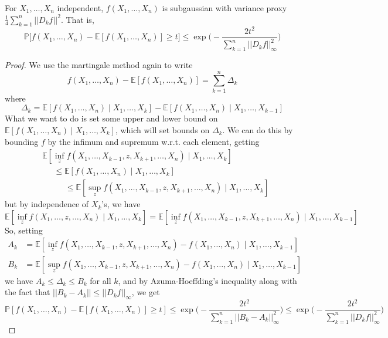 \documentclass{article}
\begin{document}
  \begin{theorem}[McDiarmid]
  For $X_1, \ldots, X_n$ independent, $f(X_1, \ldots, X_n)$ is subgaussian with variance proxy $\frac{1}{4} \sum_{k=1}^n ||D_k f||^2$. That is, 
  \[\mathbb{P}\big[ f(X_1, \ldots, X_n) - \mathbb{E}[f(X_1, \ldots, X_n)] \geq t \big] \leq \exp \bigg( -\frac{2 t^2}{\sum_{k=1}^n ||D_k f||^2_\infty} \bigg)\]
  \end{theorem}
  \begin{proof}
  We use the martingale method again to write 
  \[f(X_1, \ldots, X_n) - \mathbb{E}[f(X_1, \ldots, X_n)] = \sum_{k=1}^n \Delta_k\]
  where 
  \[\Delta_k = \mathbb{E}[f(X_1, \ldots, X_n) \mid X_1, \ldots, X_k] - \mathbb{E}[f(X_1, \ldots, X_n) \mid X_1, \ldots, X_{k-1}]\]
  What we want to do is set some upper and lower bound on $\mathbb{E}[f(X_1, \ldots, X_n) \mid X_1, \ldots, X_k]$, which will set bounds on $\Delta_k$. We can do this by bounding $f$ by the infimum and supremum w.r.t. each element, getting 
  \begin{align*}
      &\mathbb{E}[ \inf_z f(X_1, \ldots, X_{k-1}, z, X_{k+1}, \ldots, X_n) \mid X_1, \ldots, X_k] \\
      &\;\;\;\;\;\leq \mathbb{E}[f (X_1, \ldots, X_n) \mid X_1, \ldots, X_k] \\
      &\;\;\;\;\;\;\;\;\;\; \leq \mathbb{E}[ \sup_z f(X_1, \ldots, X_{k-1}, z, X_{k+1}, \ldots, X_n) \mid X_1, \ldots, X_k]
  \end{align*}
  but by independence of $X_k$'s, we have 
  \[\mathbb{E}[ \inf_z f(X_1, \ldots, z, \ldots, X_n) \mid X_1, \ldots, X_k] = \mathbb{E}[ \inf_z f(X_1, \ldots, X_{k-1}, z, X_{k+1}, \ldots, X_n) \mid X_1, \ldots, X_{k-1}]\]
  So, setting 
  \begin{align*}
      A_k & = \mathbb{E}[ \inf_z f(X_1, \ldots, X_{k-1}, z, X_{k+1}, \ldots, X_n) - f(X_1, \ldots, X_n) \mid X_1, \ldots, X_{k-1}] \\
      B_k & = \mathbb{E}[ \sup_z f(X_1, \ldots, X_{k-1}, z, X_{k+1}, \ldots, X_n) - f(X_1, \ldots, X_n) \mid X_1, \ldots, X_{k-1}]
  \end{align*}
  we have $A_k \leq \Delta_k \leq B_k$ for all $k$, and by Azuma-Hoeffding's inequality along with the fact that $||B_k - A_k|| \leq ||D_k f||_\infty$, we get 
  \[\mathbb{P}[ f(X_1, \ldots, X_n) - \mathbb{E}[ f(X_1, \ldots, X_n)] \geq t] \leq \exp \bigg(- \frac{2t^2}{\sum_{k=1}^n ||B_k - A_k||^2_\infty} \bigg) \leq \exp \bigg(- \frac{2t^2}{\sum_{k=1}^n ||D_k f||^2_\infty} \bigg)\]
  \end{proof}
\end{document}

